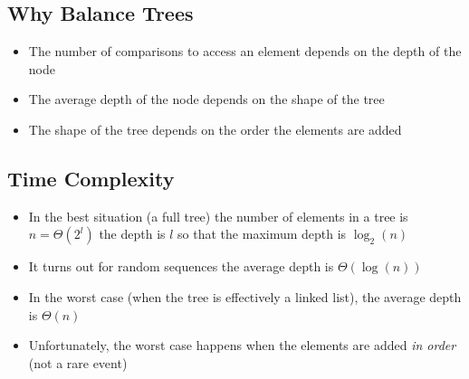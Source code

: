 \begin{slide}
\section[-2]{Why Balance Trees}

\begin{PauseHighLight}
  \begin{itemize}
  \item The number of comparisons to access an element depends on the
    depth of the node\pause
  \item The average depth of the node depends on the shape of the
    tree\pause
    \begin{center}
      \pause
    \end{center}
  \item The shape of the tree depends on the order the elements are
    added\pause
  \end{itemize}
\end{PauseHighLight}

\end{slide}


\begin{slide}
\section{Time Complexity}

\begin{PauseHighLight}
  \begin{itemize}
  \item In the best situation (a full tree) the number of elements in a
    tree is $n=\Theta(2^l)$ the depth is $l$ so that the maximum depth is
    $\log_2(n)$\pause
  \item It turns out for random sequences the average depth is
    $\Theta(\log(n))$\pause
  \item In the worst case (when the tree is effectively a linked list),
    the average depth is $\Theta(n)$\pause
  \item Unfortunately, the worst case happens when the elements are
    added \textit{in order} (not a rare event)\pause
  \end{itemize}
\end{PauseHighLight}
\end{slide}



